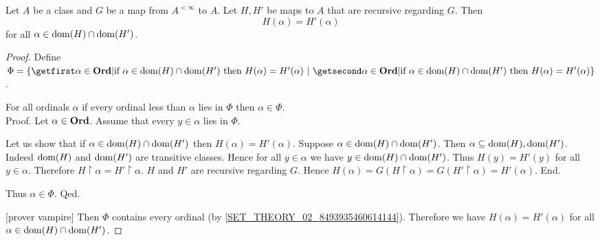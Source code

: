 \documentclass[../../set-theory/set-theory.tex]{subfiles}
\begin{document}
  \begin{forthel}
    \begin{proposition}
      Let $A$ be a class and $G$ be a map from $A^{< \infty}$ to $A$.
      Let $H, H'$ be maps to $A$ that are recursive regarding $G$.
      Then \[ H(\alpha) = H'(\alpha) \]
      for all $\alpha \in \operatorname{dom}(H) \cap \operatorname{dom}(H')$.
    \end{proposition}
    \begin{proof}
      Define $\Phi = \class{\alpha \in \Ord | \text{if $\alpha \in
      \dom(H) \cap \dom(H')$ then $H(\alpha) = H'(\alpha)$}}$.

      For all ordinals $\alpha$ if every ordinal less than $\alpha$ lies in
      $\Phi$ then $\alpha \in \Phi$. \\
      Proof.
        Let $\alpha \in \mathbf{Ord}$.
        Assume that every $y \in \alpha$ lies in $\Phi$.

        Let us show that if $\alpha \in \operatorname{dom}(H) \cap \operatorname{dom}(H')$ then
        $H(\alpha) = H'(\alpha)$.
          Suppose $\alpha \in \operatorname{dom}(H) \cap \operatorname{dom}(H')$.
          Then $\alpha \subseteq \operatorname{dom}(H), \operatorname{dom}(H')$.
          Indeed $\operatorname{dom}(H)$ and $\operatorname{dom}(H')$ are transitive classes.
          Hence for all $y \in \alpha$ we have $y \in \operatorname{dom}(H) \cap \operatorname{dom}(H')$.
          Thus $H(y) = H'(y)$ for all $y \in \alpha$.
          Therefore $H \restriction \alpha = H' \restriction \alpha$.
          $H$ and $H'$ are recursive regarding $G$.
          Hence $H(\alpha)
            = G(H \restriction \alpha)
            = G(H' \restriction \alpha)
            = H'(\alpha)$.
        End.

        Thus $\alpha \in \Phi$.
      Qed.

      [prover vampire]
      Then $\Phi$ contains every ordinal (by
      \cref{SET_THEORY_02_8493935460614144}).
      Therefore we have $H(\alpha) = H'(\alpha)$ for all
      $\alpha \in \operatorname{dom}(H) \cap \operatorname{dom}(H')$.
    \end{proof}
  \end{forthel}
\end{document}
